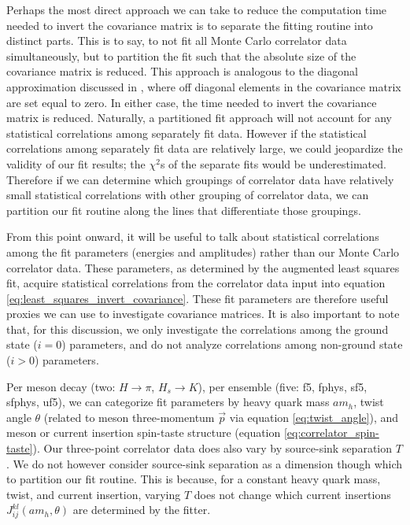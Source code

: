 Perhaps the most direct approach we can take to reduce the computation time needed to invert the covariance matrix is to separate the fitting routine into distinct parts.  This is to say, to not fit all Monte Carlo correlator data simultaneously,  but to partition the fit such that the absolute size of the covariance matrix is reduced.  This approach is analogous to the diagonal approximation discussed in \cite{Yoon2013, PhysRevD.49.2616}, where off diagonal elements in the covariance matrix are set equal to zero.  In either case, the time needed to invert the covariance matrix is reduced.  Naturally, a partitioned fit approach will not account for any statistical correlations among separately fit data.  However if the statistical correlations among separately fit data are relatively large, we could jeopardize the validity of our fit results; the $\chi^2$s of the separate fits would be underestimated.  Therefore if we can determine which groupings of correlator data have relatively small statistical correlations with other grouping of correlator data, we can partition our fit routine along the lines that differentiate those groupings.

From this point onward, it will be useful to talk about statistical correlations among the fit parameters (energies and amplitudes) rather than our Monte Carlo correlator data.  These parameters, as determined by the augmented least squares fit, acquire statistical correlations from the correlator data input into equation \ref{eq:least_squares_invert_covariance}.  These fit parameters are therefore useful proxies we can use to investigate covariance matrices.  It is also important to note that, for this discussion, we only investigate the correlations among the ground state ($i=0$) parameters, and do not analyze correlations among non-ground state ($i>0$) parameters.

Per meson decay (two: $H\rightarrow\pi$, $H_s\rightarrow K$), per ensemble (five: f5, fphys, sf5, sfphys, uf5), we can categorize fit parameters by heavy quark mass $am_h$, twist angle $\theta$ (related to meson three-momentum $\vec{p}$ via equation \ref{eq:twist_angle}), and meson or current insertion spin-taste structure (equation \ref{eq:correlator_spin-taste}).  Our three-point correlator data does also vary by source-sink separation $T$.  We do not however consider source-sink separation as a dimension though which to partition our fit routine.  This is because, for a constant heavy quark mass, twist, and current insertion, varying $T$ does not change which current insertions $J_{ij}^{kl}(am_h,\theta)$ are determined by the fitter.  


